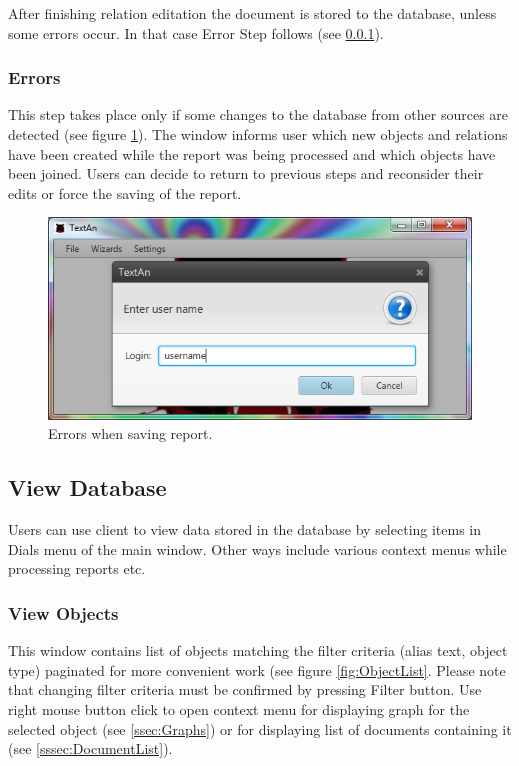 \documentclass[12pt,a4paper]{report}
\begin{document}
After finishing relation editation the document is stored to the database,
unless some errors occur. In that case Error Step follows (see
\ref{sssec:Errors}).

\subsubsection{Errors}
\label{sssec:Errors}

This step takes place only if some changes to the database from other sources
are detected (see figure \ref{fig:Errors}). The window informs user which new
objects and relations have been created while the report was being processed and
which objects have been joined. Users can decide to return to previous steps
and reconsider their edits or force the saving of the report.

\begin{figure}[!htb]
        \centering
        \includegraphics[width=\textwidth]{Images/errors}
        \caption{Errors when saving report.}
        \label{fig:Errors}
\end{figure}

\subsection{View Database}
\label{ssec:ViewDatabase}

Users can use client to view data stored in the database by selecting items
in Dials menu of the main window. Other ways include various context menus
while processing reports etc.

\subsubsection{View Objects}
\label{sssec:ObjectList}

This window contains list of objects matching the filter criteria (alias text,
object type) paginated for more convenient work (see figure \ref{fig:ObjectList}.
Please note that changing filter criteria must be confirmed by pressing Filter
button. Use right mouse button click to open context menu for displaying graph
for the selected object (see \ref{ssec:Graphs}) or for displaying list of documents containing it (see \ref{sssec:DocumentList}).
\end{document}
